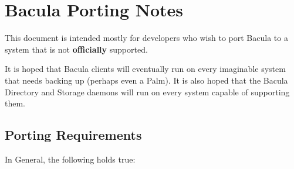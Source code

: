 
\chapter{Bacula Porting Notes}
\label{_ChapterStart1}

This document is intended mostly for developers who wish to port Bacula to a
system that is not {\bf officially} supported.

It is hoped that Bacula clients will eventually run on every imaginable system
that needs backing up (perhaps even a Palm). It is also hoped that the Bacula
Directory and Storage daemons will run on every system capable of supporting
them.

\section{Porting Requirements}

In General, the following holds true:

